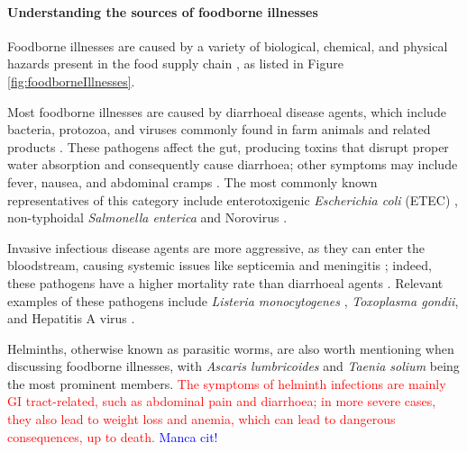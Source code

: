 \newpage
\paragraph{Understanding the sources of foodborne illnesses}
Foodborne illnesses are caused by a variety of biological, chemical, and
physical hazards present in the food supply chain \citep{marvinEarly2009}, as
listed in Figure \ref{fig:foodborneIllnesses}. 

Most foodborne illnesses are caused by diarrhoeal disease agents, which include
bacteria, protozoa, and viruses commonly found in farm animals and related
products \citep{leeEtiological2021}. These pathogens affect the gut, producing
toxins that disrupt proper water absorption and consequently cause diarrhoea;
other symptoms may include fever, nausea, and abdominal cramps
\citep{mathanDiarrhoeal1998, leeEtiological2021}. The most commonly known
representatives  of this category include enterotoxigenic \textit{Escherichia
coli} (ETEC) \citep{zhangEnterotoxigenic2022}, non-typhoidal \textit{Salmonella
enterica} \citep{ferrariWorldwide2019} and Norovirus \citep{liaoGlobal2021}.

Invasive infectious disease agents are more aggressive, as they can enter the
bloodstream, causing systemic issues like septicemia and meningitis
\citep{hodgesInfectious2010}; indeed, these pathogens have a higher mortality
rate than diarrhoeal agents \citep{kirkWorld2015}. Relevant examples of these
pathogens include \textit{Listeria monocytogenes} \citep{camargoListeria2017},
\textit{Toxoplasma gondii}, and Hepatitis A virus \citep{dicolaFoodborne2021}.

Helminths, otherwise known as parasitic worms, are also worth mentioning when
discussing foodborne illnesses, with \textit{Ascaris lumbricoides}
\citep{leungHuman2021} and \textit{Taenia solium} \citep{ngwiliQualitative2021}
being the most prominent members. \textcolor{red}{The symptoms of helminth
infections are mainly GI tract-related, such as abdominal pain and diarrhoea; in
more severe cases, they also lead to weight loss and anemia, which can lead to
dangerous consequences, up to death.} \textcolor{blue}{Manca cit!}


